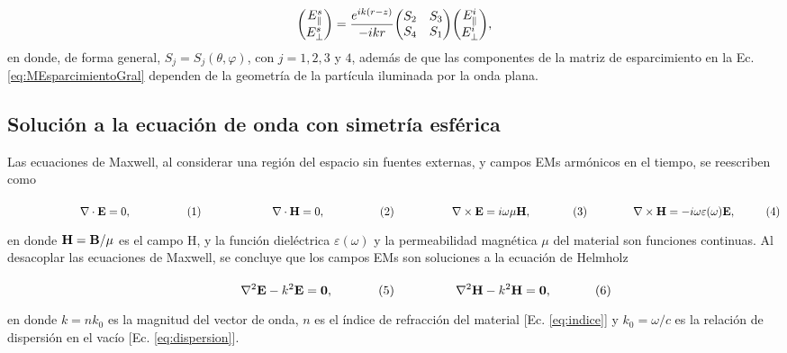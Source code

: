 	\begin{align}
	\mqty(E_{\parallel}^s\\E_{\perp}^s) = 
		\frac{e^{ik(r-z)}}{-ikr} \mqty(S_2&S_3\\S_4&S_1)
	\mqty(E_{\parallel}^i\\E_{\perp}^i),\label{eq:MEsparcimientoGral}
	\end{align}
en donde, de forma general, $S_j = S_j(\theta,\varphi)$, con $j=1,2,3$ y $4$, además de que las componentes de la matriz de esparcimiento en la Ec. \eqref{eq:MEsparcimientoGral} dependen de la geometría de la partícula iluminada por la onda plana.

	\subsection{Solución a la ecuación de onda con simetría esférica}


Las ecuaciones de Maxwell, al considerar una región del espacio sin fuentes externas, y campos EMs armónicos en el tiempo, se reescriben como \cite{jackson1999electrodynamics} 

	\begin{subequations}
	\eqhalf{\nabla\cdot \vb{E} = 0, }
	\eqhalf{\nabla\cdot \vb{H} = 0,}
	\eqhalf{\nabla \times \vb{E} = i\omega\mu \vb{H}, \label{seq:FLArm}}
	\eqhalf{\nabla\times\vb{H} = - i \omega\varepsilon(\omega) \vb{E}, }	
	\label{eqs:MaxwellArm}
	\end{subequations} \vspace*{-1em}
	
\noindent	
en donde $\vb{H} = \vb{B}/\mu$ es el campo H, y la función dieléctrica $\varepsilon(\omega)$ y la permeabilidad magnética $\mu$ del material son funciones continuas. Al desacoplar las ecuaciones de Maxwell, se concluye que los campos EMs son soluciones a la ecuación de Helmholz 

	\begin{subequations}
	\eqhalf{\nabla^2 \vb{E}- k^2 \vb{E} = \vb{0},}
	\eqhalf{\nabla^2 \vb{H}- k^2 \vb{H} = \vb{0},}
	\label{eq:Helmholtz}
	\end{subequations} \vspace*{-1em}

\noindent	
en donde $k = n k_0$ es la magnitud del vector de onda, $n$ es el índice de refracción del material [Ec. \eqref{eq:indice}] y $k_0 = \omega / c$ es la relación de dispersión en el vacío [Ec. \eqref{eq:dispersion}].

